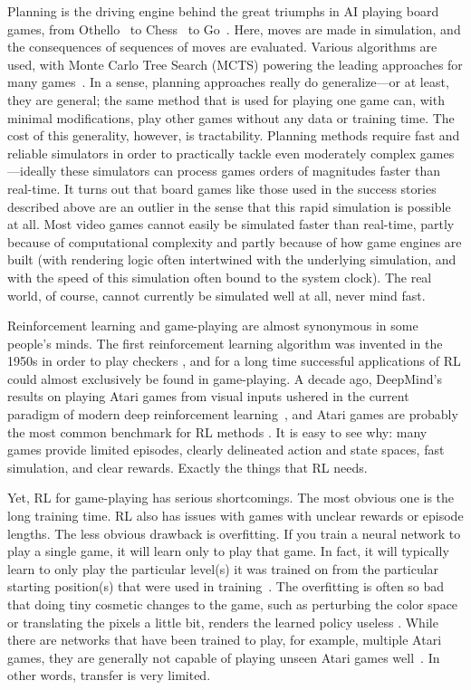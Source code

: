 \documentclass[runningheads]{llncs}
\begin{document}
Planning is the driving engine behind the great triumphs in AI playing board games, from Othello~\cite{schaeffer1996chinook} to Chess~\cite{campbell2002deep} to Go~\cite{silver2016mastering}. Here, moves are made in simulation, and the consequences of sequences of moves are evaluated. Various algorithms are used, with Monte Carlo Tree Search (MCTS) powering the leading approaches for many games~\cite{browne2012survey}. In a sense, planning approaches really do generalize---or at least, they are general; the same method that is used for playing one game can, with minimal modifications, play other games without any data or training time. The cost of this generality, however, is tractability. Planning methods require fast and reliable simulators in order to practically tackle even moderately complex games---ideally these simulators can process games orders of magnitudes faster than real-time. It turns out that board games like those used in the success stories described above are an outlier in the sense that this rapid simulation is possible at all. Most video games cannot easily be simulated faster than real-time, partly because of computational complexity and partly because of how game engines are built (with rendering logic often intertwined with the underlying simulation, and with the speed of this simulation often bound to the system clock). The real world, of course, cannot currently be simulated well at all, never mind fast.

Reinforcement learning and game-playing are almost synonymous in some people's minds. The first reinforcement learning algorithm was invented in the 1950s in order to play checkers \cite{samuel1959some}, and for a long time successful applications of RL could almost exclusively be found in game-playing. A decade ago, DeepMind's results on playing Atari games from visual inputs ushered in the current paradigm of modern deep reinforcement learning~\cite{mnih2013playing}, and Atari games are probably the most common benchmark for RL methods \cite{delfosse2024ocatari}. It is easy to see why: many games provide limited episodes, clearly delineated action and state spaces, fast simulation, and clear rewards. Exactly the things that RL needs.

Yet, RL for game-playing has serious shortcomings. The most obvious one is the long training time. RL also has issues with games with unclear rewards or episode lengths. The less obvious drawback is overfitting. If you train a neural network to play a single game, it will learn only to play that game. In fact, it will typically learn to only play the particular level(s) it was trained on from the particular starting position(s) that were used in training~\cite{justesen2018illuminating}. The overfitting is often so bad that doing tiny cosmetic changes to the game, such as perturbing the color space or translating the pixels a little bit, renders the learned policy useless \cite{zhang2018study,yarats2020image}. While there are networks that have been trained to play, for example, multiple Atari games, they are generally not capable of playing unseen Atari games well~\cite{lee2022multi}. In other words, transfer is very limited.
\end{document}
